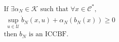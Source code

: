 \documentclass[preview]{standalone}
\begin{document}
\begin{align*}
&\text{If } \exists \alpha_N \in \mathcal{K} \text{ such  that }\forall x \in \mathcal{C}^*,\\ &\ \sup_{u \in \mathcal{U}} \dot b_N(x, u) + \alpha_N(b_N(x)) \geq 0\\ &\text{then } b_N \text{ is an ICCBF.}
\end{align*}
\end{document}
